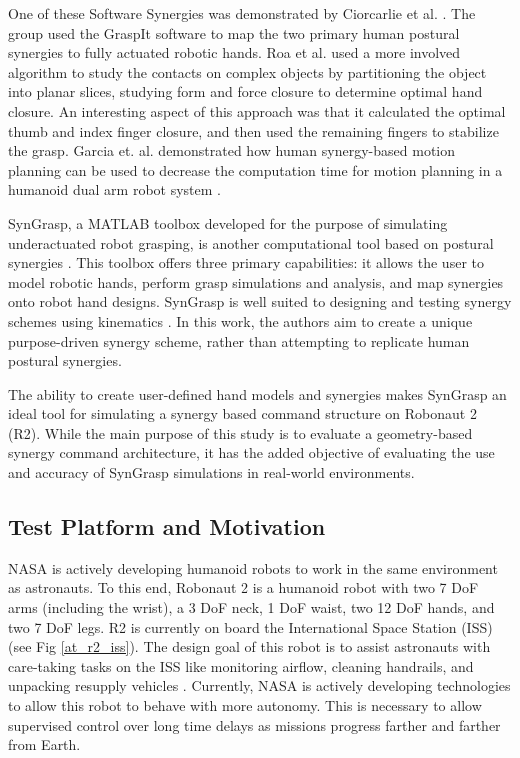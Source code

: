 \documentclass[runningheads,a4paper]{llncs}
\begin{document}
 One of these Software Synergies was demonstrated by Ciorcarlie et al. \cite{ciocarlie_2007_dexterous}. The group used the GraspIt software to map the two primary human postural synergies to fully actuated robotic hands. Roa et al. \cite{power_grasp} used a more involved algorithm to study the contacts on complex objects by partitioning the object into planar slices, studying form and force closure \cite{bicchi} to determine optimal hand closure. An interesting aspect of this approach was that it calculated the optimal thumb and index finger closure, and then used the remaining fingers to stabilize the grasp. Garcia et. al. demonstrated how human synergy-based motion planning can be used to decrease the computation time for motion planning in a humanoid dual arm robot system \cite{garcia}.

SynGrasp, a MATLAB toolbox developed for the purpose of simulating underactuated robot grasping, is another computational tool based on postural synergies \cite{syngrasp}. This toolbox offers three primary capabilities: it allows the user to model robotic hands, perform grasp simulations and analysis, and map synergies onto robot hand designs. SynGrasp is well suited to designing and testing synergy schemes using kinematics \cite{salvietti_2016_map}. In this work, the authors aim to create a unique purpose-driven synergy scheme, rather than attempting to replicate human postural synergies.

The ability to create user-defined hand models and synergies makes SynGrasp an ideal tool for simulating a synergy based command structure on Robonaut 2 (R2).
While the main purpose of this study is to evaluate a geometry-based synergy command architecture, it has the added objective of evaluating the use and accuracy of SynGrasp simulations in real-world environments.

\subsection{Test Platform and Motivation}

NASA is actively developing humanoid robots to work in the same environment as astronauts. To this end, Robonaut 2 is a humanoid robot with two 7 DoF arms (including the wrist), a 3 DoF neck, 1 DoF waist, two 12 DoF hands, and two 7 DoF legs. R2 is currently on board the International Space Station (ISS) (see Fig \ref{at_r2_iss}). The design goal of this robot is to assist astronauts with care-taking tasks on the ISS like monitoring airflow, cleaning handrails, and unpacking resupply vehicles \cite{r2_diftler}. Currently, NASA is actively developing technologies to allow this robot to behave with more autonomy. This is necessary to allow supervised control over long time delays as missions progress farther and farther from Earth. 
\end{document}
